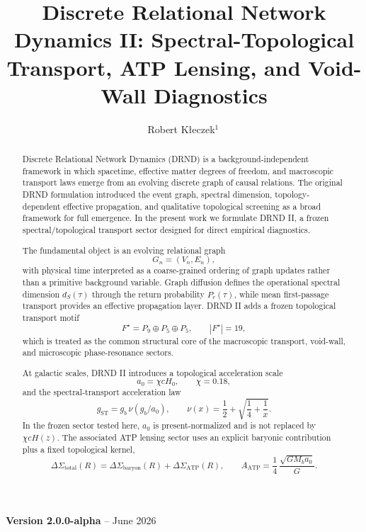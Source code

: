 \documentclass[12pt]{iopart}
\begin{document}
\title[DRND II]{Discrete Relational Network Dynamics II: Spectral-Topological Transport, ATP Lensing, and Void-Wall Diagnostics}

\author{Robert K\l{}eczek$^{1}$\,}
\address{$^{1}$Independent Researcher}

\vspace{10pt}
\begin{indented}
\item[]\textbf{Version 2.0.0-alpha} -- June 2026
\end{indented}

\begin{abstract}
Discrete Relational Network Dynamics (DRND) is a background-independent framework in which spacetime, effective matter degrees of freedom, and macroscopic transport laws emerge from an evolving discrete graph of causal relations. The original DRND formulation introduced the event graph, spectral dimension, topology-dependent effective propagation, and qualitative topological screening as a broad framework for full emergence. In the present work we formulate DRND II, a frozen spectral/topological transport sector designed for direct empirical diagnostics.

The fundamental object is an evolving relational graph
\[
G_n=(V_n,E_n),
\]
with physical time interpreted as a coarse-grained ordering of graph updates rather than a primitive background variable. Graph diffusion defines the operational spectral dimension $d_S(\tau)$ through the return probability $P_r(\tau)$, while mean first-passage transport provides an effective propagation layer. DRND II adds a frozen topological transport motif
\[
F^\star=P_9\oplus P_5\oplus P_5,\qquad |F^\star|=19,
\]
which is treated as the common structural core of the macroscopic transport, void-wall, and microscopic phase-resonance sectors.

At galactic scales, DRND II introduces a topological acceleration scale
\[
a_0=\chi cH_0,\qquad \chi=0.18,
\]
and the spectral-transport acceleration law
\[
g_{\mathrm{ST}}=g_b\,\nu(g_b/a_0),
\qquad
\nu(x)=\frac12+\sqrt{\frac14+\frac1x}.
\]
In the frozen sector tested here, \(a_0\) is present-normalized and is not replaced by \(\chi cH(z)\).
The associated ATP lensing sector uses an explicit baryonic contribution plus a fixed topological kernel,
\[
\Delta\Sigma_{\mathrm{total}}(R)
=
\Delta\Sigma_{\mathrm{baryon}}(R)
+
\Delta\Sigma_{\mathrm{ATP}}(R),
\qquad
A_{\mathrm{ATP}}
=
\frac14\,\frac{\sqrt{GM_ba_0}}{G}.
\]


\end{abstract}
\end{document}
